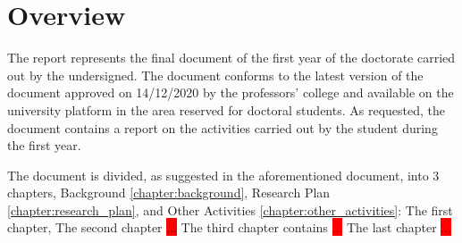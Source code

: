 \clearpage
\chapter*{Overview}\label{chapter:overview}

The report represents the final document of the first year of the doctorate carried out by the undersigned. The document conforms to the latest version of the document \hyperlink{https://corsi.unisa.it/ingegneria-dell-informazione/didattica/guida-dello-studente}{\textit{}} approved on 14/12/2020 by the professors' college and available on the university platform in the area reserved for doctoral students. As requested, the document contains a report on the activities carried out by the student during the first year. \par
The document is divided, as suggested in the aforementioned document, into 3 chapters, Background \ref{chapter:background}, Research Plan \ref{chapter:research_plan}, and Other Activities \ref{chapter:other_activities}: 
\newline The first chapter, 
\newline The second chapter \colorbox{red}{...} 
\newline The third chapter contains \colorbox{red}{...}
\newline The last chapter \colorbox{red}{...}

